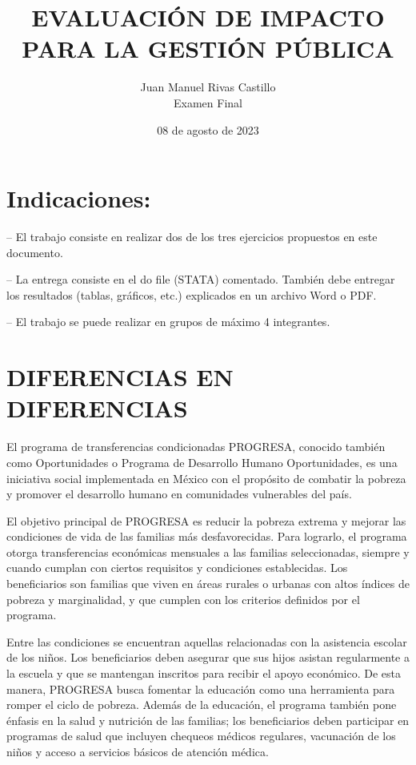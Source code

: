\documentclass[12pt]{article}
\title{EVALUACIÓN DE IMPACTO PARA LA GESTIÓN PÚBLICA }
\author{Juan Manuel Rivas Castillo \\
\large Examen Final}
\date{08 de agosto de 2023}
\begin{document}

\tableofcontents\newpage



\section{Indicaciones:}

– El trabajo consiste en realizar dos de los tres ejercicios propuestos en este documento. 

\vspace{0.5cm}

– La entrega consiste en el do file (STATA) comentado. También debe entregar los resultados (tablas, gráficos, etc.) explicados en un archivo Word o PDF. 

\vspace{0.5cm}

– El trabajo se puede realizar en grupos de máximo 4 integrantes. 


\vspace{0.5cm}

\section{DIFERENCIAS EN DIFERENCIAS}

El programa de transferencias condicionadas PROGRESA, conocido también como Oportunidades o Programa de Desarrollo Humano Oportunidades, es una iniciativa social implementada en México con el propósito de combatir la pobreza y promover el desarrollo humano en comunidades vulnerables del país. 

\vspace{0.5cm}

El objetivo principal de PROGRESA es reducir la pobreza extrema y mejorar las condiciones de vida de las familias más desfavorecidas. Para lograrlo, el programa otorga transferencias económicas mensuales a las familias seleccionadas, siempre y cuando cumplan con ciertos requisitos y condiciones establecidas. Los beneficiarios son familias que viven en áreas rurales o urbanas con altos índices de pobreza y marginalidad, y que cumplen con los criterios definidos por el programa. 

\vspace{0.5cm}

Entre las condiciones se encuentran aquellas relacionadas con la asistencia escolar de los niños. Los beneficiarios deben asegurar que sus hijos asistan regularmente a la escuela y que se mantengan inscritos para recibir el apoyo económico. De esta manera, PROGRESA busca fomentar la educación como una herramienta para romper el ciclo de pobreza. Además de la educación, el programa también pone énfasis en la salud y nutrición de las familias; los beneficiarios deben participar en programas de salud que incluyen chequeos médicos regulares, vacunación de los niños y acceso a servicios básicos de atención médica. 
\end{document}
